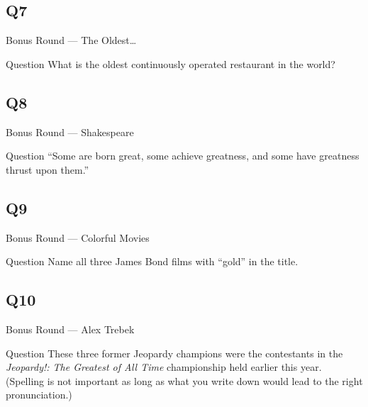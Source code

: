 \documentclass[11pt]{beamer}
\begin{document}
\subsection*{Q7}
\begin{frame}[t]{Bonus Round --- The Oldest…}
\vspace{-0.5em}
\begin{block}{Question}
What is the oldest continuously operated restaurant in the world?
\end{block}
\end{frame}
\subsection*{Q8}
\begin{frame}[t]{Bonus Round --- Shakespeare}
\vspace{-0.5em}
\begin{block}{Question}
``Some are born great, some achieve greatness, and some have greatness thrust upon them.''
\end{block}
\end{frame}
\subsection*{Q9}
\begin{frame}[t]{Bonus Round --- Colorful Movies}
\vspace{-0.5em}
\begin{block}{Question}
Name all three James Bond films with ``gold'' in the title.
\end{block}
\end{frame}
\subsection*{Q10}
\begin{frame}[t]{Bonus Round --- Alex Trebek}
\vspace{-0.5em}
\begin{block}{Question}
These three former Jeopardy champions were the contestants in the \emph{Jeopardy!: The Greatest of All Time} championship held earlier this year. (Spelling is not important as long as what you write down would lead to the right pronunciation.)
\end{block}
\end{frame}
\end{document}
